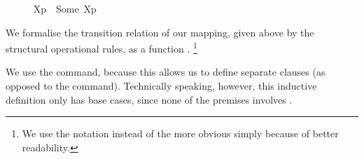 \begin{isabellebody}
\ \ {\isacharparenleft}{\kern0pt}{\isacartoucheopen}{\isasymtheta}{\isacharbrackleft}{\kern0pt}{\isacharunderscore}{\kern0pt}{\isacharbrackright}{\kern0pt}{\isacharprime}{\kern0pt}{\isacharparenleft}{\kern0pt}{\isacharunderscore}{\kern0pt}{\isacharprime}{\kern0pt}{\isacharparenright}{\kern0pt}{\isacartoucheclose}{\isacharparenright}{\kern0pt}\isanewline
\ \ \ {\isacartoucheopen}{\isasymtheta}{\isacharbrackleft}{\kern0pt}X{\isacharbrackright}{\kern0pt}{\isacharparenleft}{\kern0pt}p{\isacharparenright}{\kern0pt}\ {\isasymequiv}\ {\isasymtheta}{\isacharquery}{\kern0pt}{\isacharbrackleft}{\kern0pt}Some\ X{\isacharbrackright}{\kern0pt}{\isacharparenleft}{\kern0pt}p{\isacharparenright}{\kern0pt}{\isacartoucheclose}\isanewline
\isanewline
%
\isadelimunimportant
%
\endisadelimunimportant
%
\isatagunimportant
%
\endisatagunimportant
{\isafoldunimportant}%
%
\isadelimunimportant
%
\endisadelimunimportant
%
\isadelimdocument
%
\endisadelimdocument
%
\isatagdocument
%
\isamarkuptrue%
%
\endisatagdocument
{\isafolddocument}%
%
\isadelimdocument
%
\endisadelimdocument
%
\begin{isamarkuptext}%
We formalise the transition relation of our mapping, given above by the structural operational rules, as a function .%
\footnote{We use the notation \isa{{\isacharunderscore}{\kern0pt}\ {\isasymlongmapsto}\isactrlsup {\isasymtheta}{\isacharunderscore}{\kern0pt}\ {\isacharunderscore}{\kern0pt}} instead of the more obvious \isa{{\isacharunderscore}{\kern0pt}\ {\isasymlongmapsto}\isactrlsub {\isasymtheta}{\isacharunderscore}{\kern0pt}\ {\isacharunderscore}{\kern0pt}} simply because of better readability.}

We use the  command, because this allows us to define separate clauses (as opposed to the  command). Technically speaking, however, this inductive definition only has base cases, since none of the premises involves \isa{{\isasymlongmapsto}\isactrlsup {\isasymtheta}}.


\end{isamarkuptext}
\end{isabellebody}
